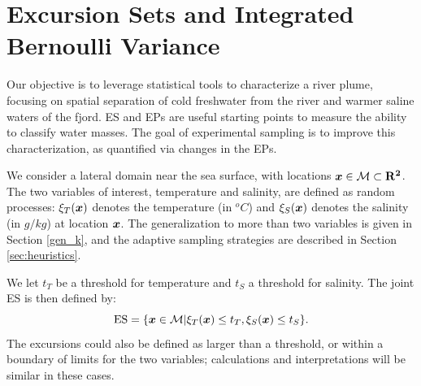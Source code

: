 \documentclass[aoas]{imsart}
\begin{document}






\section{Excursion Sets and Integrated Bernoulli Variance}
\label{sec:ESEP}

Our objective is to leverage statistical tools to characterize a river
plume, focusing on spatial separation of cold freshwater from the
river and warmer saline waters of the fjord. ES and EPs are useful
starting points to measure the ability to classify water masses. The
goal of experimental sampling is to improve this
characterization, as quantified via changes in the EPs.

We consider a lateral domain near the sea surface, with locations
${\boldsymbol x} \in \mathcal{M} \subset \mathbf{R^2}$. The two variables of
interest, temperature and salinity, are defined as random processes:
$\xi_T({\boldsymbol x})$ denotes the temperature (in $^o C$) and $\xi_S({\boldsymbol x})$
denotes the salinity (in $g/kg$) at location ${\boldsymbol x}$. The generalization
to more than two variables is given in Section \ref{gen_k}, and the
adaptive sampling strategies are described in Section
\ref{sec:heuristics}.

We let $t_T$ be a threshold for temperature and $t_S$ a threshold for
salinity. The joint ES is then defined by:
\begin{equation}\label{ES}
     \mbox{ES} = \{\bx \in \mathcal{M} | \xi_T(\bx) \leq t_T,\xi_S(\bx) \leq t_S\}.
\end{equation}
The excursions could also be defined as larger than a threshold, or
within a boundary of limits for the two variables; calculations and
interpretations will be similar in these cases.
\end{document}
